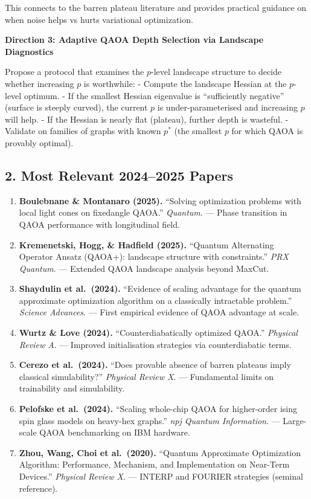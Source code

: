 \documentclass[
  11pt,
]{report}
\begin{document}
This connects to the barren plateau literature and provides practical
guidance on when noise helps vs hurts variational optimization.

\textbf{Direction 3: Adaptive QAOA Depth Selection via Landscape
Diagnostics}

Propose a protocol that examines the \(p\)-level landscape structure to
decide whether increasing \(p\) is worthwhile: - Compute the landscape
Hessian at the \(p\)-level optimum. - If the smallest Hessian eigenvalue
is ``sufficiently negative'' (surface is steeply curved), the current
\(p\) is under-parameterised and increasing \(p\) will help. - If the
Hessian is nearly flat (plateau), further depth is wasteful. - Validate
on families of graphs with known \(p^*\) (the smallest \(p\) for which
QAOA is provably optimal).

\subsection{2. Most Relevant 2024--2025
Papers}\label{most-relevant-20242025-papers}

\begin{enumerate}
\def\labelenumi{\arabic{enumi}.}
\item
  \textbf{Boulebnane \& Montanaro (2025).} ``Solving optimization
  problems with local light cones on fixedangle QAOA.'' \emph{Quantum}.
  --- Phase transition in QAOA performance with longitudinal field.
\item
  \textbf{Kremenetski, Hogg, \& Hadfield (2025).} ``Quantum Alternating
  Operator Ansatz (QAOA+): landscape structure with constraints.''
  \emph{PRX Quantum}. --- Extended QAOA landscape analysis beyond
  MaxCut.
\item
  \textbf{Shaydulin et al.~(2024).} ``Evidence of scaling advantage for
  the quantum approximate optimization algorithm on a classically
  intractable problem.'' \emph{Science Advances}. --- First empirical
  evidence of QAOA advantage at scale.
\item
  \textbf{Wurtz \& Love (2024).} ``Counterdiabatically optimized QAOA.''
  \emph{Physical Review A}. --- Improved initialisation strategies via
  counterdiabatic terms.
\item
  \textbf{Cerezo et al.~(2024).} ``Does provable absence of barren
  plateaus imply classical simulability?'' \emph{Physical Review X}. ---
  Fundamental limits on trainability and simulability.
\item
  \textbf{Pelofske et al.~(2024).} ``Scaling whole-chip QAOA for
  higher-order ising spin glass models on heavy-hex graphs.'' \emph{npj
  Quantum Information}. --- Large-scale QAOA benchmarking on IBM
  hardware.
\item
  \textbf{Zhou, Wang, Choi et al.~(2020).} ``Quantum Approximate
  Optimization Algorithm: Performance, Mechanism, and Implementation on
  Near-Term Devices.'' \emph{Physical Review X}. --- INTERP and FOURIER
  strategies (seminal reference).
\end{enumerate}
\end{document}
